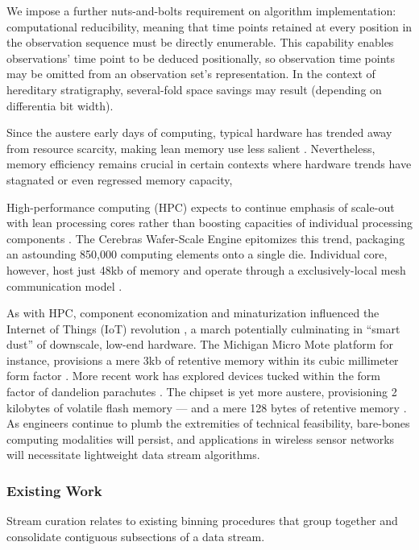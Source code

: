 We impose a further nuts-and-bolts requirement on algorithm implementation: computational reducibility, meaning that time points retained at every position in the observation sequence must be directly enumerable.
This capability enables observations' time point to be deduced positionally, so observation time points may be omitted from an observation set's representation.
In the context of hereditary stratigraphy, several-fold space savings may result (depending on differentia bit width).

Since the austere early days of computing, typical hardware has trended away from resource scarcity, making lean memory use less salient \citep{kushida2015cloud}.
Nevertheless, memory efficiency remains crucial in certain contexts where hardware trends have stagnated or even regressed memory capacity,

High-performance computing (HPC) expects to continue emphasis of scale-out with lean processing cores rather than boosting capacities of individual processing components \citep{sutter2005free,morgenstern2021unparalleled}.
The Cerebras Wafer-Scale Engine epitomizes this trend, packaging an astounding 850,000 computing elements onto a single die.
Individual core, however, host just 48kb of memory and operate through a exclusively-local mesh communication model \citep{cerebras2021wafer,lauterbach2021path}.

As with HPC, component economization and minaturization influenced the Internet of Things (IoT) revolution \citep{rfc7228,ojo2018review}, a march potentially culminating in ``smart dust'' \citep{warneke2001smart} of downscale, low-end hardware.
The Michigan Micro Mote platform for instance, provisions a mere 3kb of retentive memory within its cubic millimeter form factor \citep{lee2012modular}.
More recent work has explored devices tucked within the form factor of dandelion parachutes \citep{iyer2022wind}.
The chipset is yet more austere, provisioning 2 kilobytes of volatile flash memory --- and a mere 128 bytes of retentive memory \citep{microchip2014atiny20}.
As engineers continue to plumb the extremities of technical feasibility, bare-bones computing modalities will persist, and applications in wireless sensor networks will necessitate lightweight data stream algorithms.

\subsubsection{Existing Work}

Stream curation relates to existing binning procedures that group together and consolidate contiguous subsections of a data stream.

